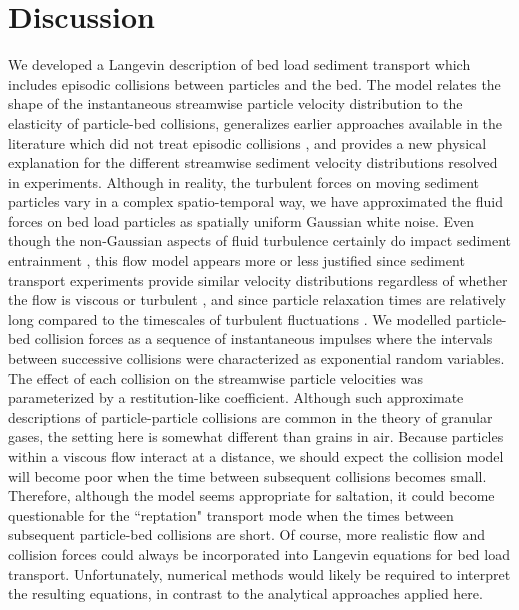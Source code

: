 \section{Discussion}
\label{sec:discussion}

We developed a Langevin description of bed load sediment transport which includes episodic collisions between particles and the bed.
The model relates the shape of the instantaneous streamwise particle velocity distribution to the elasticity of particle-bed collisions,
generalizes earlier approaches available in the literature which did not treat episodic collisions \citep{Ancey2014,Fan2014}, and provides a new physical explanation for the different streamwise sediment velocity distributions resolved in experiments.
Although in reality, the turbulent forces on moving sediment particles vary in a complex spatio-temporal way, we have approximated the fluid forces on bed load particles as spatially uniform Gaussian white noise. Even though the non-Gaussian aspects of fluid turbulence certainly do impact sediment entrainment \citep{Coleman2019,Celik2014}, this flow model appears more or less justified since sediment transport experiments provide similar velocity distributions regardless of whether the flow is viscous or turbulent \citep{Lajeunesse2010, Charru2004}, and since particle relaxation times are relatively long compared to the timescales of turbulent fluctuations \citep{}.
We modelled particle-bed collision forces as a sequence of instantaneous impulses where the intervals between successive collisions were characterized as exponential random variables. The effect of each collision on the streamwise particle velocities was parameterized by a restitution-like coefficient.
Although such approximate descriptions of particle-particle collisions are common in the theory of granular gases, the setting here is somewhat different than grains in air. Because particles within a viscous flow interact at a distance, we should expect the collision model will become poor when the time between subsequent collisions becomes small. Therefore, although the model seems appropriate for saltation, it could become questionable for the ``reptation" transport mode when the times between subsequent particle-bed collisions are short. Of course, more realistic flow and collision forces could always be incorporated into Langevin equations for bed load transport. Unfortunately, numerical methods would likely be required to interpret the resulting equations, in contrast to the analytical approaches applied here.

